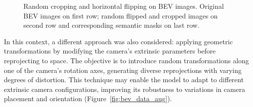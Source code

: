 \begin{figure}[ht]
\begin{tabular}{c c c c c c c c}
    \end{tabular}
    
    \caption{Random cropping and horizontal flipping on BEV images. Original BEV images on first row; random flipped and cropped images on second row and corresponding semantic masks on last row.}
    \label{fig:bev_cropping}
\end{figure}

In this context, a different approach was also considered: applying geometric transformations by modifying the camera's extrinsic parameters before reprojecting to  space. The objective is to introduce random transformations along one of the camera’s rotation axes, generating diverse  reprojections with varying degrees of distortion. This technique may enable the model to adapt to different extrinsic camera configurations, improving its robustness to variations in camera placement and orientation (Figure~\ref{fig:bev_data_aug}).

